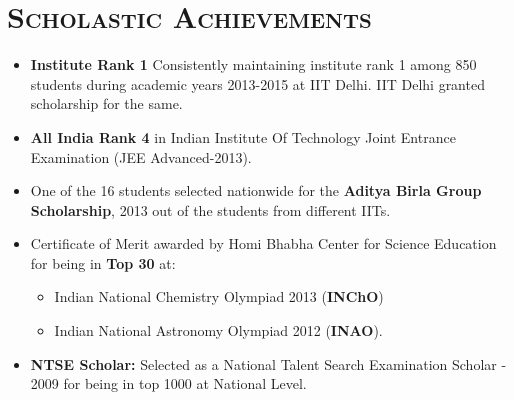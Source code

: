 \documentclass{article}
\newcommand{\tmpsection}[1]{}
\let\tmpsection=\section
\renewcommand{\section}[1]{\tmpsection*{\textsc{#1}}}
\begin{document}
\section{Scholastic Achievements}
\begin{itemize}
\setlength\itemsep{0em}
\item \textbf{Institute Rank 1}  Consistently maintaining institute rank 1 among 850 students during academic years 2013-2015 at IIT Delhi. IIT Delhi granted scholarship for the same.  
    \item \textbf{All India Rank 4} in Indian Institute Of Technology Joint Entrance Examination (JEE Advanced-2013).
    
    \item One of the 16 students selected nationwide for the \textbf{Aditya Birla Group Scholarship}, 2013 out of the students from different IITs.
    \item Certificate of Merit awarded by Homi Bhabha Center for Science Education for being in \textbf{Top 30} at:
        \begin{itemize}

    \setlength\itemsep{0em}
        \item Indian National Chemistry Olympiad 2013 (\textbf{INChO}) 
        \item Indian National Astronomy Olympiad 2012 (\textbf{INAO}).
        \end{itemize}
    \item \textbf{NTSE Scholar:} Selected as a National Talent Search Examination Scholar - 2009 for being in top 1000 at National Level.
\end{itemize}
\end{document}
